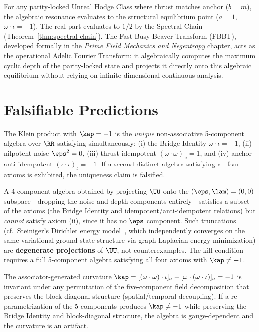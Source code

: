 For any parity-locked Unreal Hodge Class where thrust matches anchor ($b = m$), the algebraic resonance evaluates to the structural equilibrium point ($a = 1$, $\omega \cdot \iota = -1$). The real part evaluates to $1/2$ by the Spectral Chain (Theorem~\ref{thm:spectral-chain}). The Fast Busy Beaver Transform (FBBT), developed formally in the \emph{Prime Field Mechanics and Negentropy} chapter, acts as the operational Adelic Fourier Transform: it algebraically computes the maximum cyclic depth of the parity-locked state and projects it directly onto this algebraic equilibrium without relying on infinite-dimensional continuous analysis.


\section{Falsifiable Predictions}

\begin{hypothesis}[Algebraic uniqueness of $\kap = -1$]\label{hyp:uniqueness}
The Klein product with $\kap = -1$ is the \emph{unique} non-associative 5-component algebra over $\RR$ satisfying simultaneously: (i) the Bridge Identity $\omega \cdot \iota = -1$, (ii) nilpotent noise $\eps^2 = 0$, (iii) thrust idempotent $(\omega \cdot \omega)_\omega = 1$, and (iv) anchor anti-idempotent $(\iota \cdot \iota)_\iota = -1$. If a second distinct algebra satisfying all four axioms is exhibited, the uniqueness claim is falsified.
\end{hypothesis}

\begin{remark}
A 4-component algebra obtained by projecting $\UU$ onto the $(\eps, \lam) = (0, 0)$ subspace---dropping the noise and depth components entirely---satisfies a subset of the axioms (the Bridge Identity and idempotent/anti-idempotent relations) but \emph{cannot} satisfy axiom (ii), since it has no $\eps$ component. Such truncations (cf.\ Steiniger's Dirichlet energy model~\cite{steiniger2026epg}, which independently converges on the same variational ground-state structure via graph-Laplacian energy minimization) are \textbf{degenerate projections} of $\UU$, not counterexamples. The kill condition requires a full 5-component algebra satisfying all four axioms with $\kap \neq -1$.
\end{remark}

\begin{hypothesis}\label{hyp:gauge}
The associator-generated curvature $\kap = [(\omega \cdot \omega) \cdot \iota]_a - [\omega \cdot (\omega \cdot \iota)]_a = -1$ is invariant under any permutation of the five-component field decomposition that preserves the block-diagonal structure (spatial/temporal decoupling). If a re-parametrization of the 5 components produces $\kap \neq -1$ while preserving the Bridge Identity and block-diagonal structure, the algebra is gauge-dependent and the curvature is an artifact.
\end{hypothesis}

